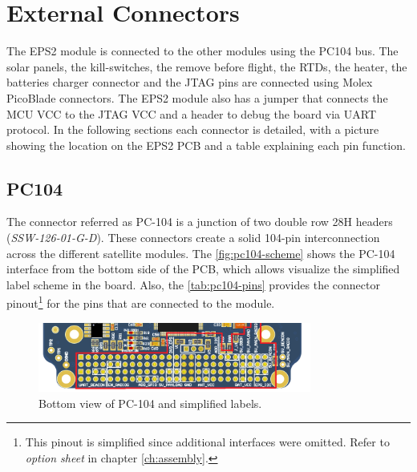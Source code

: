 \section{External Connectors}

The EPS2 module is connected to the other modules using the PC104 bus. The solar panels, the kill-switches, the remove before flight, the RTDs, the heater, the batteries charger connector and the JTAG pins are connected using Molex PicoBlade connectors. The EPS2 module also has a jumper that connects the MCU VCC to the JTAG VCC and a header to debug the board via UART protocol. In the following sections each connector is detailed, with a picture showing the location on the EPS2 PCB and a table explaining each pin function.

\subsection{PC104}

The connector referred as PC-104 is a junction of two double row 28H headers (\textit{SSW-126-01-G-D}). These connectors create a solid 104-pin interconnection across the different satellite modules. The \autoref{fig:pc104-scheme} shows the PC-104 interface from the bottom side of the PCB, which allows visualize the simplified label scheme in the board. Also, the \autoref{tab:pc104-pins} provides the connector pinout\footnote{This pinout is simplified since additional interfaces were omitted. Refer to \textit{option sheet} in chapter \ref{ch:assembly}.} for the pins that are connected to the module. 

\begin{figure}[!ht]
    \begin{center}
        \includegraphics[width=0.8\textwidth]{figures/eps2_pc104_scheme.png}
        \caption{Bottom view of PC-104 and simplified labels.}
        \label{fig:pc104-scheme}
    \end{center}
\end{figure}

